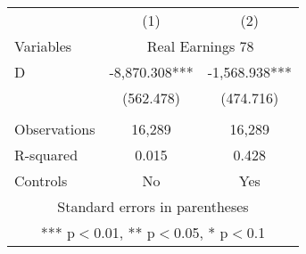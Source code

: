\begin{tabular}{lcc} \hline\hline
 & (1) & (2) \\
Variables & \multicolumn{2}{c}{Real Earnings 78} \\ \hline 
D & -8,870.308*** & -1,568.938*** \\
 & (562.478) & (474.716) \\
 &  &  \\ \hline
Observations & 16,289 & 16,289 \\
R-squared & 0.015 & 0.428 \\
 Controls & No & Yes \\ \hline\hline
\multicolumn{3}{c}{ Standard errors in parentheses} \\
\multicolumn{3}{c}{ *** p$<$0.01, ** p$<$0.05, * p$<$0.1} \\
\end{tabular}
